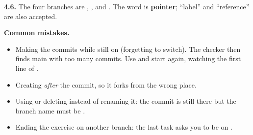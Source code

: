 \textbf{4.6.} The four branches are , ,  and . The word is \textbf{pointer}; ``label'' and ``reference'' are also accepted.

\textbf{Common mistakes.}
\begin{itemize}
  \item Making the  commits while still on  (forgetting to switch). The checker then finds main with too many commits. Use  and start again, watching the first line of .
  \item Creating  \emph{after} the  commit, so it forks from the wrong place.
  \item Using  or deleting  instead of renaming it: the commit is still there but the branch name must be .
  \item Ending the exercise on another branch: the last task asks you to be on .
\end{itemize}
